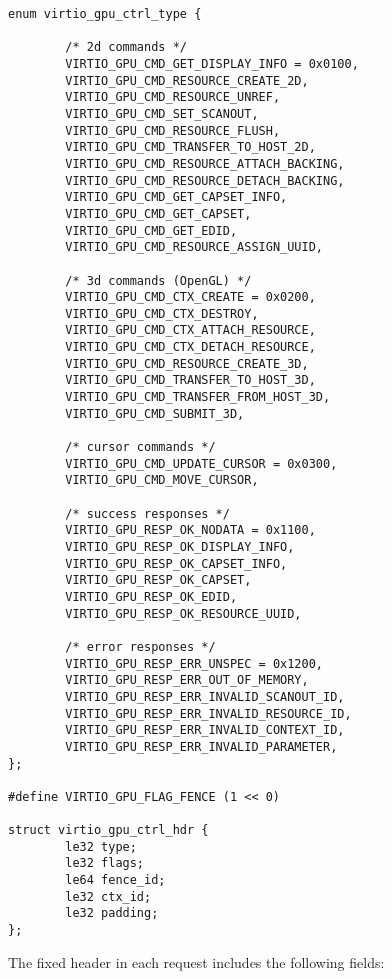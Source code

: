 \begin{lstlisting}
enum virtio_gpu_ctrl_type {

        /* 2d commands */
        VIRTIO_GPU_CMD_GET_DISPLAY_INFO = 0x0100,
        VIRTIO_GPU_CMD_RESOURCE_CREATE_2D,
        VIRTIO_GPU_CMD_RESOURCE_UNREF,
        VIRTIO_GPU_CMD_SET_SCANOUT,
        VIRTIO_GPU_CMD_RESOURCE_FLUSH,
        VIRTIO_GPU_CMD_TRANSFER_TO_HOST_2D,
        VIRTIO_GPU_CMD_RESOURCE_ATTACH_BACKING,
        VIRTIO_GPU_CMD_RESOURCE_DETACH_BACKING,
        VIRTIO_GPU_CMD_GET_CAPSET_INFO,
        VIRTIO_GPU_CMD_GET_CAPSET,
        VIRTIO_GPU_CMD_GET_EDID,
        VIRTIO_GPU_CMD_RESOURCE_ASSIGN_UUID,

        /* 3d commands (OpenGL) */
        VIRTIO_GPU_CMD_CTX_CREATE = 0x0200,
        VIRTIO_GPU_CMD_CTX_DESTROY,
        VIRTIO_GPU_CMD_CTX_ATTACH_RESOURCE,
        VIRTIO_GPU_CMD_CTX_DETACH_RESOURCE,
        VIRTIO_GPU_CMD_RESOURCE_CREATE_3D,
        VIRTIO_GPU_CMD_TRANSFER_TO_HOST_3D,
        VIRTIO_GPU_CMD_TRANSFER_FROM_HOST_3D,
        VIRTIO_GPU_CMD_SUBMIT_3D,

        /* cursor commands */
        VIRTIO_GPU_CMD_UPDATE_CURSOR = 0x0300,
        VIRTIO_GPU_CMD_MOVE_CURSOR,

        /* success responses */
        VIRTIO_GPU_RESP_OK_NODATA = 0x1100,
        VIRTIO_GPU_RESP_OK_DISPLAY_INFO,
        VIRTIO_GPU_RESP_OK_CAPSET_INFO,
        VIRTIO_GPU_RESP_OK_CAPSET,
        VIRTIO_GPU_RESP_OK_EDID,
        VIRTIO_GPU_RESP_OK_RESOURCE_UUID,

        /* error responses */
        VIRTIO_GPU_RESP_ERR_UNSPEC = 0x1200,
        VIRTIO_GPU_RESP_ERR_OUT_OF_MEMORY,
        VIRTIO_GPU_RESP_ERR_INVALID_SCANOUT_ID,
        VIRTIO_GPU_RESP_ERR_INVALID_RESOURCE_ID,
        VIRTIO_GPU_RESP_ERR_INVALID_CONTEXT_ID,
        VIRTIO_GPU_RESP_ERR_INVALID_PARAMETER,
};

#define VIRTIO_GPU_FLAG_FENCE (1 << 0)

struct virtio_gpu_ctrl_hdr {
        le32 type;
        le32 flags;
        le64 fence_id;
        le32 ctx_id;
        le32 padding;
};
\end{lstlisting}

The fixed header  in each
request includes the following fields:

